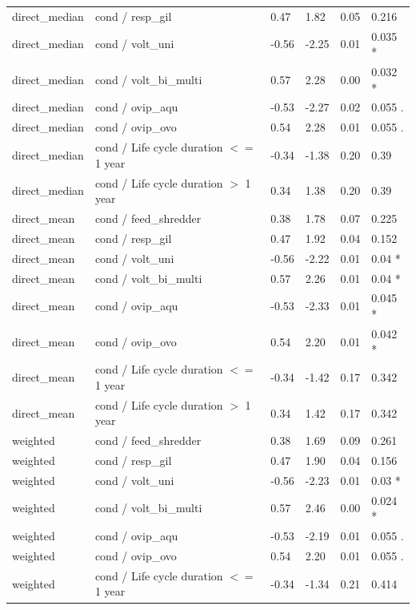 \documentclass[12pt]{article}
\begin{document}
\begin{longtable}[H]{m{2.6cm}|m{7.3cm}|m{1cm}|m{1.4cm}|m{1.5cm}|m{1.5cm}}
      direct\_median & cond / resp\_gil & 0.47 & 1.82 & 0.05 & 0.216 \\ 
      direct\_median & cond / volt\_uni & -0.56 & -2.25 & 0.01 & 0.035 * \\ 
      direct\_median & cond / volt\_bi\_multi & 0.57 & 2.28 & 0.00 & 0.032 * \\ 
      direct\_median & cond / ovip\_aqu & -0.53 & -2.27 & 0.02 & 0.055 . \\ 
      direct\_median & cond / ovip\_ovo & 0.54 & 2.28 & 0.01 & 0.055 . \\ 
      direct\_median & cond / Life cycle duration $<=$ 1 year & -0.34 & -1.38 & 0.20 & 0.39 \\ 
      direct\_median & cond / Life cycle duration $>$ 1 year & 0.34 & 1.38 & 0.20 & 0.39 \\ 
      \midrule
      direct\_mean & cond / feed\_shredder & 0.38 & 1.78 & 0.07 & 0.225 \\ 
      direct\_mean & cond / resp\_gil & 0.47 & 1.92 & 0.04 & 0.152 \\ 
      direct\_mean & cond / volt\_uni & -0.56 & -2.22 & 0.01 & 0.04 * \\ 
      direct\_mean & cond / volt\_bi\_multi & 0.57 & 2.26 & 0.01 & 0.04 * \\ 
      direct\_mean & cond / ovip\_aqu & -0.53 & -2.33 & 0.01 & 0.045 * \\ 
      direct\_mean & cond / ovip\_ovo & 0.54 & 2.20 & 0.01 & 0.042 * \\ 
      direct\_mean & cond / Life cycle duration $<=$ 1 year & -0.34 & -1.42 & 0.17 & 0.342 \\ 
      direct\_mean & cond / Life cycle duration $>$ 1 year & 0.34 & 1.42 & 0.17 & 0.342 \\
      \midrule 
      weighted & cond / feed\_shredder & 0.38 & 1.69 & 0.09 & 0.261 \\ 
      weighted & cond / resp\_gil & 0.47 & 1.90 & 0.04 & 0.156 \\ 
      weighted & cond / volt\_uni & -0.56 & -2.23 & 0.01 & 0.03 * \\ 
      weighted & cond / volt\_bi\_multi & 0.57 & 2.46 & 0.00 & 0.024 * \\ 
      weighted & cond / ovip\_aqu & -0.53 & -2.19 & 0.01 & 0.055 . \\ 
      weighted & cond / ovip\_ovo & 0.54 & 2.20 & 0.01 & 0.055 . \\ 
      weighted & cond / Life cycle duration $<=$ 1 year & -0.34 & -1.34 & 0.21 & 0.414 \\ 

\end{longtable}
\end{document}

